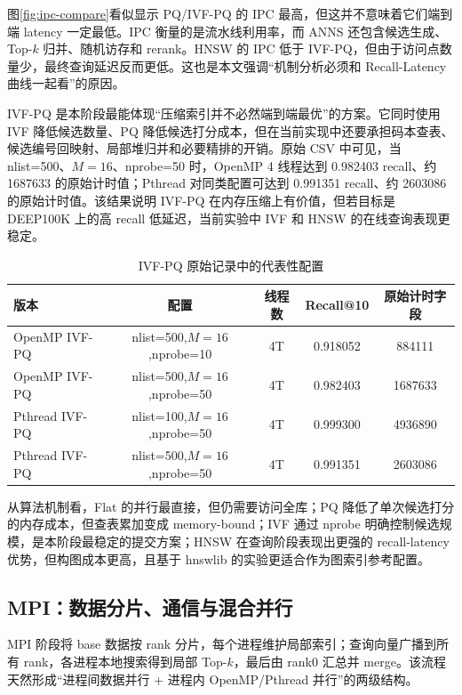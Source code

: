 \documentclass[a4paper]{article}
\begin{document}
图\ref{fig:ipc-compare}看似显示 PQ/IVF-PQ 的 IPC 最高，但这并不意味着它们端到端 latency 一定最低。IPC 衡量的是流水线利用率，而 ANNS 还包含候选生成、Top-$k$ 归并、随机访存和 rerank。HNSW 的 IPC 低于 IVF-PQ，但由于访问点数量少，最终查询延迟反而更低。这也是本文强调“机制分析必须和 Recall-Latency 曲线一起看”的原因。

IVF-PQ 是本阶段最能体现“压缩索引并不必然端到端最优”的方案。它同时使用 IVF 降低候选数量、PQ 降低候选打分成本，但在当前实现中还要承担码本查表、候选编号回映射、局部堆归并和必要精排的开销。原始 CSV 中可见，当 nlist=500、$M=16$、nprobe=50 时，OpenMP 4 线程达到 0.982403 recall、约 1687633 的原始计时值；Pthread 对同类配置可达到 0.991351 recall、约 2603086 的原始计时值。该结果说明 IVF-PQ 在内存压缩上有价值，但若目标是 DEEP100K 上的高 recall 低延迟，当前实验中 IVF 和 HNSW 的在线查询表现更稳定。

\begin{table}[H]
\centering
\scriptsize
\caption{IVF-PQ 原始记录中的代表性配置}
\label{tab:ivfpq-detail}
\begin{tabular}{lcccc}
\toprule
版本 & 配置 & 线程数 & Recall@10 & 原始计时字段 \\
\midrule
OpenMP IVF-PQ & nlist=500,$M=16$,nprobe=10 & 4T & 0.918052 & 884111 \\
OpenMP IVF-PQ & nlist=500,$M=16$,nprobe=50 & 4T & 0.982403 & 1687633 \\
Pthread IVF-PQ & nlist=100,$M=16$,nprobe=50 & 4T & 0.999300 & 4936890 \\
Pthread IVF-PQ & nlist=500,$M=16$,nprobe=50 & 4T & 0.991351 & 2603086 \\
\bottomrule
\end{tabular}
\end{table}

从算法机制看，Flat 的并行最直接，但仍需要访问全库；PQ 降低了单次候选打分的内存成本，但查表累加变成 memory-bound；IVF 通过 nprobe 明确控制候选规模，是本阶段最稳定的提交方案；HNSW 在查询阶段表现出更强的 recall-latency 优势，但构图成本更高，且基于 hnswlib 的实验更适合作为图索引参考配置。

\subsection{MPI：数据分片、通信与混合并行}

MPI 阶段将 base 数据按 rank 分片，每个进程维护局部索引；查询向量广播到所有 rank，各进程本地搜索得到局部 Top-$k$，最后由 rank0 汇总并 merge。该流程天然形成“进程间数据并行 + 进程内 OpenMP/Pthread 并行”的两级结构。
\end{document}
